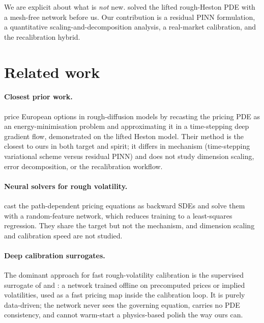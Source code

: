 \documentclass[review,12pt]{elsarticle}
\begin{document}
We are explicit about what is \emph{not} new.  \citet{papapantoleon2025timestepping}
solved the lifted rough-Heston PDE with a mesh-free network before us.  Our
contribution is a residual PINN formulation, a quantitative scaling-and-decomposition
analysis, a real-market calibration, and the recalibration hybrid.

\section{Related work}
\label{sec:related}

\paragraph{Closest prior work.}
\citet{papapantoleon2025timestepping} price European options in rough-diffusion
models by recasting the pricing PDE as an energy-minimisation problem and
approximating it in a time-stepping deep gradient flow, demonstrated on the lifted
Heston model.  Their method is the closest to ours in both target and spirit;
it differs in mechanism (time-stepping variational scheme versus residual PINN)
and does not study dimension scaling, error decomposition, or the recalibration
workflow.

\paragraph{Neural solvers for rough volatility.}
\citet{jacquier2023random} cast the path-dependent pricing equations as backward
SDEs and solve them with a random-feature network, which reduces training to a
least-squares regression.  They share the target but not the mechanism, and
dimension scaling and calibration speed are not studied.

\paragraph{Deep calibration surrogates.}
The dominant approach for fast rough-volatility calibration is the supervised
surrogate of \citet{bayer2019deep} and \citet{horvath2021deep}: a network trained
offline on precomputed prices or implied volatilities, used as a fast pricing map
inside the calibration loop.  It is purely data-driven; the network never sees the
governing equation, carries no PDE consistency, and cannot warm-start a
physics-based polish the way ours can.
\end{document}
